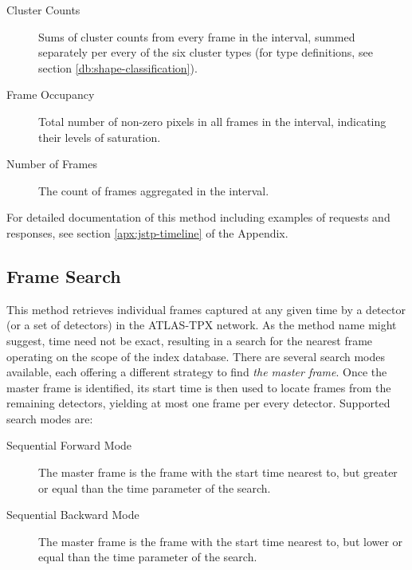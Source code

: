 \begin{description}
	\item[Cluster Counts]
	Sums of cluster counts from every frame in the interval, summed separately per every of the six cluster types (for type definitions, see section \ref{db:shape-classification}).

	\item[Frame Occupancy]
	Total number of non-zero pixels in all frames in the interval, indicating their levels of saturation.

	\item[Number of Frames]
	The count of frames aggregated in the interval.
\end{description}

For detailed documentation of this method including examples of requests and responses, see section \ref{apx:jstp-timeline} of the Appendix.

\subsection{Frame Search}
This method retrieves individual frames captured at any given time by a detector (or a set of detectors) in the ATLAS-TPX network. As the method name might suggest, time need not be exact, resulting in a search for the nearest frame operating on the scope of the index database. There are several search modes available, each offering a different strategy to find \textit{the master frame}. Once the master frame is identified, its start time is then used to locate frames from the remaining detectors, yielding at most one frame per every detector. Supported search modes are:

\begin{description}
	\item[Sequential Forward Mode]
	The master frame is the frame with the start time nearest to, but greater or equal than the time parameter of the search.

	\item[Sequential Backward Mode]
	The master frame is the frame with the start time nearest to, but lower or equal than the time parameter of the search.

\end{description}

